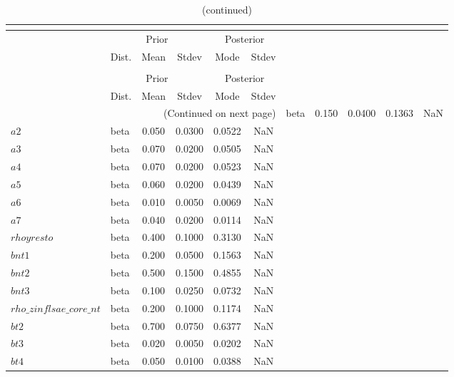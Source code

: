  
\begin{center}
\begin{longtable}{llcccc} 
\caption{Results from posterior maximization (parameters)}\\
 \label{Table:Posterior:1}\\
\toprule 
  & \multicolumn{3}{c}{Prior}  &  \multicolumn{2}{c}{Posterior} \\
  \cmidrule(r{.75em}){2-4} \cmidrule(r{.75em}){5-6}
  & Dist. & Mean  & Stdev & Mode & Stdev \\ 
\midrule \endfirsthead 
\caption{(continued)}\\
 \bottomrule 
  & \multicolumn{3}{c}{Prior}  &  \multicolumn{2}{c}{Posterior} \\
  \cmidrule(r{.75em}){2-4} \cmidrule(r{.75em}){5-6}
  & Dist. & Mean  & Stdev & Mode & Stdev \\ 
\midrule \endhead 
\bottomrule \multicolumn{6}{r}{(Continued on next page)}\endfoot 
\bottomrule\endlastfoot 
$a1$ & beta &   0.150 & 0.0400 &   0.1363 &     NaN \\ 
$a2$ & beta &   0.050 & 0.0300 &   0.0522 &     NaN \\ 
$a3$ & beta &   0.070 & 0.0200 &   0.0505 &     NaN \\ 
$a4$ & beta &   0.070 & 0.0200 &   0.0523 &     NaN \\ 
$a5$ & beta &   0.060 & 0.0200 &   0.0439 &     NaN \\ 
$a6$ & beta &   0.010 & 0.0050 &   0.0069 &     NaN \\ 
$a7$ & beta &   0.040 & 0.0200 &   0.0114 &     NaN \\ 
$rhoyresto$ & beta &   0.400 & 0.1000 &   0.3130 &     NaN \\ 
$bnt1$ & beta &   0.200 & 0.0500 &   0.1563 &     NaN \\ 
$bnt2$ & beta &   0.500 & 0.1500 &   0.4855 &     NaN \\ 
$bnt3$ & beta &   0.100 & 0.0250 &   0.0732 &     NaN \\ 
$rho\_zinflsae\_core\_nt$ & beta &   0.200 & 0.1000 &   0.1174 &     NaN \\ 
$bt2$ & beta &   0.700 & 0.0750 &   0.6377 &     NaN \\ 
$bt3$ & beta &   0.020 & 0.0050 &   0.0202 &     NaN \\ 
$bt4$ & beta &   0.050 & 0.0100 &   0.0388 &     NaN \\ 

\end{longtable}
\end{center}
